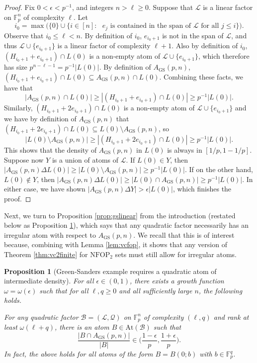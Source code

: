 \documentclass[12pt,oneside,british,a4wide]{amsart}
\newtheorem{proposition}[theorem]{Proposition}
\numberwithin{equation}{section}
\theoremstyle{definition}
\def\F{\mathbb{F}}
\def\NFOP{\mathrm{NFOP}}
\def\GS{\mathrm{GS}}
\def\e{\epsilon}
\newcommand{\calL}{\mathcal{L}}
\newcommand{\calB}{\mathcal{B}}
\newcommand{\calQ}{\mathcal{Q}}
\newcommand{\At}{{\mathrm{At}}}
\begin{document}
\begin{proof}
Fix $0<\e<p^{-1}$, and integers $n>\ell\geq0$.    Suppose that $\calL$ is a linear factor on $\F_p^n$ of complexity $\ell$.  Let 
$$
i_0=\max\Big(\{0\}\cup \{i\in [n]: \text{ $e_j$ is contained in the span of $\calL$ for all $j\leq i$}\}\Big).
$$ 
Observe that $i_0\leq \ell<n$.  By definition of $i_0$, $e_{i_0+1}$ is not in the span of $\calL$, and  thus $\calL\cup \{e_{i_0+1}\}$ is a linear factor of complexity $\ell+1$.  Also by definition of $i_0$, $(H_{i_0+1}+e_{i_0+1})\cap L(0)$ is a non-empty atom of $\calL\cup \{e_{i_0+1}\}$, which therefore has size $p^{n-\ell-1}=p^{-1}|L(0)|$.  By definition of $A_{\GS}(p,n)$, $(H_{i_0+1}+e_{i_0+1})\cap L(0)\subseteq A_{\GS}(p,n)\cap L(0)$. Combining these facts, we have that
$$
|A_{\GS}(p,n)\cap L(0)|\geq | (H_{i_0+1}+e_{i_0+1})\cap L(0)|\geq p^{-1}|L(0)|.
$$
Similarly, $(H_{i_0+1}+2e_{i_0+1})\cap L(0)$ is a non-empty atom of $\calL\cup \{e_{i_0+1}\}$ and we have by definition of $A_{\GS}(p,n)$ that $ (H_{i_0+1}+2e_{i_0+1})\cap L(0)\subseteq L(0)\setminus A_{\GS}(p,n)$, so
$$
|L(0)\setminus A_{\GS}(p,n)|\geq | (H_{i_0+1}+2e_{i_0+1})\cap L(0)|\geq p^{-1}|L(0)|.
$$
This shows that the density of $A_{\GS}(p,n)$ in $L(0)$ is always in $[1/p,1-1/p]$.  Suppose now $Y$ is a union of atoms of $\calL$. If $L(0)\in Y$, then $|A_{\GS}(p,n)\Delta L(0)|\geq |L(0)\setminus A_{\GS}(p,n)|\geq p^{-1}|L(0)|$.  If on the other hand, $L(0)\notin Y$, then $|A_{\GS}(p,n)\Delta L(0)|\geq |L(0)\cap A_{\GS}(p,n)|\geq p^{-1}|L(0)|$.  In either case, we have shown $|A_{\GS}(p,n)\Delta Y|>\e |L(0)|$, which finishes the proof. \end{proof}



Next, we turn to Proposition \ref{prop:gslinear} from the introduction (restated below as Proposition \ref{prop:gslinearrecall}), which says that any quadratic factor necessarily has an irregular atom with respect to $A_{\GS}(p,n)$. We recall that this is of interest because, combining with Lemma \ref{lem:vcfop}, it shows that any version of Theorem \ref{thm:vc2finite} for $\NFOP_2$ sets must still allow for irregular atoms.


\begin{proposition}[Green-Sanders example requires a quadratic atom of intermediate density]\label{prop:gslinearrecall}
For all $\e\in (0,1)$, there exists a growth function $\omega=\omega(\e)$ such that for all $\ell,q\geq 0$ and all sufficiently large $n$, the following holds. 

For any quadratic factor $\calB=(\calL,\calQ)$ on $\mathbb{F}_p^n$ of complexity $(\ell,q)$ and rank at least $\omega(\ell+q)$, there is an atom $B\in \At(\calB)$ such that 
$$
\frac{|B\cap A_{\GS}(p,n)|}{|B|}\in \Big(\frac{1-\e}{p},\frac{1+\e}{p}\Big).  
$$
In fact, the above holds for all atoms of the form $B=B(0;b)$ with $b\in \F_p^q$.\end{proposition}
\end{document}
